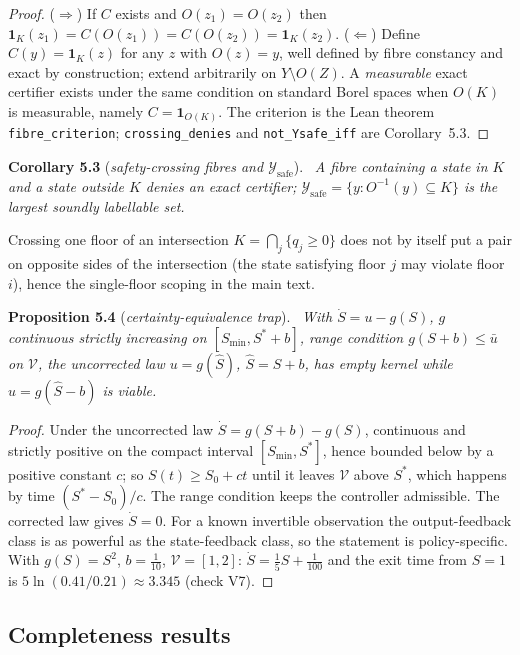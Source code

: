 \documentclass[11pt,a4paper]{article}
\theoremstyle{plain}
\theoremstyle{definition}
\theoremstyle{remark}
\newenvironment{restated}[2]{\par\medskip\noindent\textbf{#1} (\textit{#2}).\ \itshape}{\par\medskip}
\newcommand{\cV}{\mathcal{V}}
\newcommand{\cY}{\mathcal{Y}}
\begin{document}
\begin{proof}
($\Rightarrow$) If $C$ exists and $O(z_1)=O(z_2)$ then $\mathbf 1_K(z_1)=C(O(z_1))=C(O(z_2))=\mathbf 1_K(z_2)$. ($\Leftarrow$) Define $C(y)=\mathbf 1_K(z)$ for any $z$ with $O(z)=y$, well defined by fibre constancy and exact by construction; extend arbitrarily on $Y\setminus O(Z)$. A \emph{measurable} exact certifier exists under the same condition on standard Borel spaces when $O(K)$ is measurable, namely $C=\mathbf 1_{O(K)}$. The criterion is the Lean theorem \texttt{fibre\_criterion}; \texttt{crossing\_denies} and \texttt{not\_Ysafe\_iff} are Corollary~5.3.
\end{proof}

\begin{restated}{Corollary 5.3}{safety-crossing fibres and $\cY_{\mathrm{safe}}$}
A fibre containing a state in $K$ and a state outside $K$ denies an exact certifier; $\cY_{\mathrm{safe}}=\{y:O^{-1}(y)\subseteq K\}$ is the largest soundly labellable set.
\end{restated}

Crossing one floor of an intersection $K=\bigcap_j\{q_j\ge0\}$ does not by itself put a pair on opposite sides of the intersection (the state satisfying floor $j$ may violate floor $i$), hence the single-floor scoping in the main text.

\begin{restated}{Proposition 5.4}{certainty-equivalence trap}
With $\dot S=u-g(S)$, $g$ continuous strictly increasing on $[S_{\min},S^*+b]$, range condition $g(S+b)\le\bar u$ on $\cV$, the uncorrected law $u=g(\hat S)$, $\hat S=S+b$, has empty kernel while $u=g(\hat S-b)$ is viable.
\end{restated}

\begin{proof}
Under the uncorrected law $\dot S=g(S+b)-g(S)$, continuous and strictly positive on the compact interval $[S_{\min},S^*]$, hence bounded below by a positive constant $c$; so $S(t)\ge S_0+ct$ until it leaves $\cV$ above $S^*$, which happens by time $(S^*-S_0)/c$. The range condition keeps the controller admissible. The corrected law gives $\dot S=0$. For a known invertible observation the output-feedback class is as powerful as the state-feedback class, so the statement is policy-specific. With $g(S)=S^2$, $b=\tfrac1{10}$, $\cV=[1,2]$: $\dot S=\tfrac15S+\tfrac1{100}$ and the exit time from $S=1$ is $5\ln(0.41/0.21)\approx3.345$ (check V7).
\end{proof}

\subsection{Completeness results}\label{S:completeness}
\end{document}
